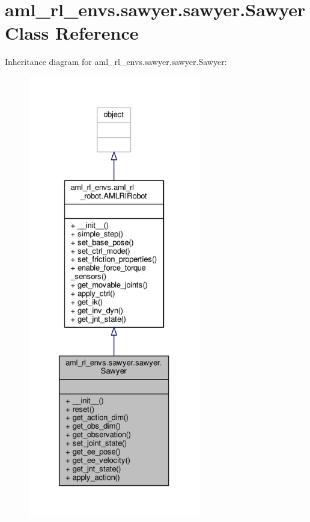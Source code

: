 \hypertarget{classaml__rl__envs_1_1sawyer_1_1sawyer_1_1_sawyer}{\section{aml\-\_\-rl\-\_\-envs.\-sawyer.\-sawyer.\-Sawyer Class Reference}
\label{classaml__rl__envs_1_1sawyer_1_1sawyer_1_1_sawyer}
}


Inheritance diagram for aml\-\_\-rl\-\_\-envs.\-sawyer.\-sawyer.\-Sawyer\-:
\nopagebreak
\begin{figure}[H]
\begin{center}
\leavevmode
\includegraphics[height=550pt]{classaml__rl__envs_1_1sawyer_1_1sawyer_1_1_sawyer__inherit__graph}
\end{center}
\end{figure}


